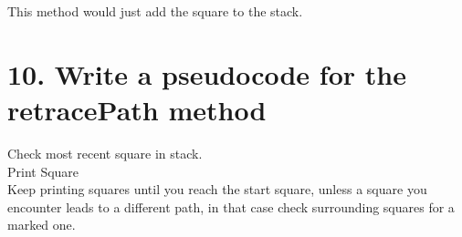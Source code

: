\documentclass[a4paper,11pt]{article}
\theoremstyle{mytheor}
\begin{document}
This method would just add the square to the stack.

\section*{10. Write a pseudocode for the retracePath method}
Check most recent square in stack.\\
Print Square\\
Keep printing squares until you reach the start square, unless a square you encounter leads to a different path, in that case check surrounding squares for a marked one.
\end{document}
